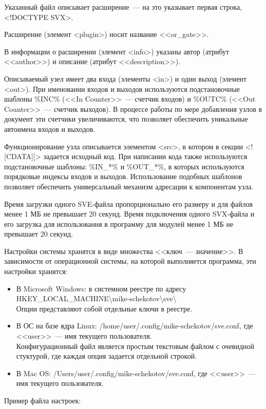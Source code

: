 Указанный файл описывает расширение~--- на это указывает первая строка, <!DOCTYPE SVX>.

Расширение (элемент <plugin>) носит название <<or\_gate>>.

В информации о расширении (элемент <info>) указаны автор (атрибут <<author>>) и описание (атрибут <<description>>).

Описываемый узел имеет два входа (элементы <in>) и один выход (элемент <out>).
При именовании входов и выходов используются подстановочные шаблоны \%INC\% (<<In Counter>>~--- счетчик входов) и \%OUTC\% (<<Out Counter>>~--- счетчик выходов).
В процессе работы по мере добавления узлов в документ эти счетчики увеличиваются, что позволяет обеспечить уникальные автоимена входов и выходов.

Функционирование узла описывается элементом <src>, в котором в секции <![CDATA]]> задается исходный код.
При написании кода также используются подстановочные шаблоны: \%IN\_*\% и \%OUT\_*\%, в которых используются порядковые индексы входов и выходов.
Использование подобных шаблонов позволяет обеспечить универсальный механизм адресации к компонентам узла.

Время загрузки одного SVE-файла пропорционально его размеру и для файлов менее 1 МБ не превышает 20 секунд.
Время подключения одного SVX-файла и его загрузка для использования в программу для модулей менее 1 МБ не превышает 20 секунд.

Настройки системы хранятся в виде множества <<ключ~--- значение>>.
В зависимости от операционной системы, на которой выполняется программа, эти настройки хранятся:
\begin{itemize}
  \item В Microsoft Windows: в системном реестре по адресу HKEY\_LOCAL\_MACHINE\textbackslash mike-schekotov\textbackslash sve\textbackslash\\
  Опции представляют собой отдельные ключи в реестре.
  \item В ОС на базе ядра Linux: /home/user/.config/mike-schekotov/sve.conf, где <<user>>~--- имя текущего пользователя.\\
  Конфигурационный файл является простым текстовым файлом с очевидной стуктурой, где каждая опция задается отдельной строкой.
  \item В Mac OS: /Users/user/.config/mike-schekotov/sve.conf, где <<user>>~--- имя текущего пользователя.
\end{itemize}

Пример файла настроек:

